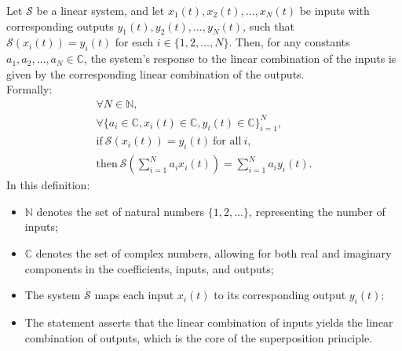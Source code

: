 \documentclass[../notes-main.tex]{subfiles}
\begin{document}
\begin{mdframed}
    Let \(\mathcal{S}\) be a linear system, and let \(x_1(t), x_2(t), \dots, x_N(t)\) be inputs with corresponding outputs \(y_1(t), y_2(t), \dots, y_N(t)\), such that \(\mathcal{S}(x_i(t)) = y_i(t)\) for each \(i \in \{1, 2, \dots, N\}\). Then, for any constants \(a_1, a_2, \dots, a_N \in \mathbb{C}\), the system's response to the linear combination of the inputs is given by the corresponding linear combination of the outputs.\\
    Formally:
    \begin{gather}
        \forall N \in \mathbb{N}, \\
        \forall \{a_i \in \mathbb{C}, x_i(t) \in \mathbb{C}, y_i(t) \in \mathbb{C}\}_{i=1}^N, \\
        \text{if} \ \mathcal{S}(x_i(t)) = y_i(t) \ \text{for all} \ i, \\
        \text{then} \ \mathcal{S}\left(\sum_{i=1}^{N} a_i x_i(t)\right) = \sum_{i=1}^{N} a_i y_i(t).
        \label{eq:linear-superposition-puremath-equation}
    \end{gather}
    In this definition:
    \begin{itemize}
        \item \(\mathbb{N}\) denotes the set of natural numbers \(\{1,2,\dots\}\), representing the number of inputs;
        \item \(\mathbb{C}\) denotes the set of complex numbers, allowing for both real and imaginary components in the coefficients, inputs, and outputs;
        \item The system \(\mathcal{S}\) maps each input \(x_i(t)\) to its corresponding output \(y_i(t)\);
        \item The statement asserts that the linear combination of inputs yields the linear combination of outputs, which is the core of the superposition principle.
    \end{itemize}
\end{mdframed}
\label{fig:linear-superposition-puremath-md}
\end{document}
